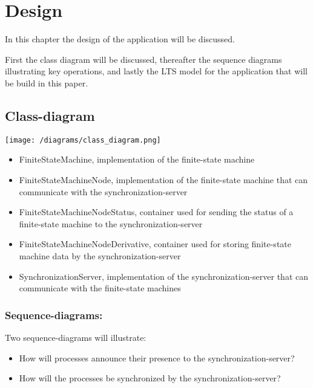\hypertarget{design}{%
\chapter{Design}\label{design}}

In this chapter the design of the application will be discussed.

First the class diagram will be discussed, thereafter the sequence
diagrams illustrating key operations, and lastly the LTS model for the
application that will be build in this paper.

\hypertarget{class-diagram}{%
\section{Class-diagram}\label{class-diagram}}

\texttt{[image: /diagrams/class\_diagram.png]}

\begin{itemize}
\tightlist
\item
  FiniteStateMachine, implementation of the finite-state machine
\item
  FiniteStateMachineNode, implementation of the finite-state machine
  that can communicate with the synchronization-server
\item
  FiniteStateMachineNodeStatus, container used for sending the status of
  a finite-state machine to the synchronization-server
\item
  FiniteStateMachineNodeDerivative, container used for storing
  finite-state machine data by the synchronization-server
\item
  SynchronizationServer, implementation of the synchronization-server
  that can communicate with the finite-state machines
\end{itemize}

\hypertarget{sequence-diagrams}{%
\subsection{Sequence-diagrams:}\label{sequence-diagrams}}

Two sequence-diagrams will illustrate:

\begin{itemize}
\tightlist
\item
  How will processes announce their presence to the
  synchronization-server?
\item
  How will the processes be synchronized by the synchronization-server?
\end{itemize}


